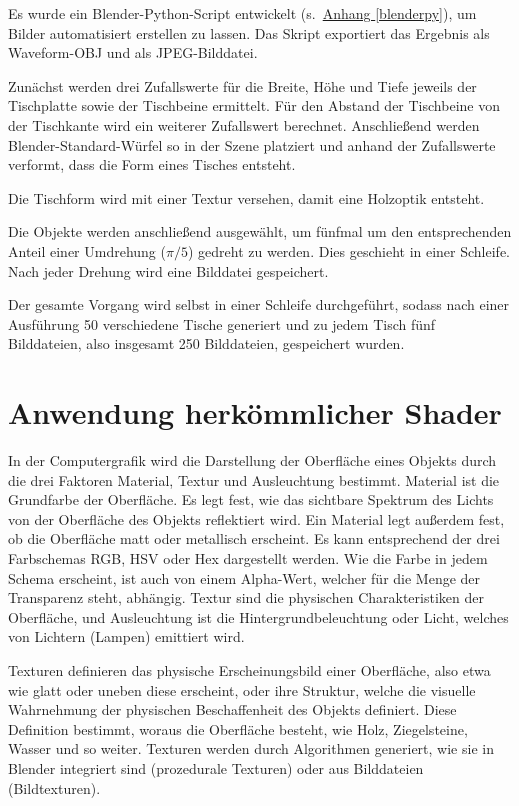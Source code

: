 Es wurde ein Blender-Python-Script entwickelt (s.~\hyperref[blenderpy]{Anhang \ref{blenderpy}}), um Bilder automatisiert erstellen zu lassen. Das Skript exportiert das Ergebnis als Waveform-OBJ und als JPEG-Bilddatei.

Zunächst werden drei Zufallswerte für die Breite, Höhe und Tiefe jeweils der Tischplatte sowie der Tischbeine ermittelt. Für den Abstand der Tischbeine von der Tischkante wird ein weiterer Zufallswert berechnet. Anschließend werden Blender-Standard-Würfel so in der Szene platziert und anhand der Zufallswerte verformt, dass die Form eines Tisches entsteht.

Die Tischform wird mit einer Textur versehen, damit eine Holzoptik entsteht.

Die Objekte werden anschließend ausgewählt, um fünfmal um den entsprechenden Anteil einer Umdrehung ($\pi/5$) gedreht zu werden. Dies geschieht in einer Schleife. Nach jeder Drehung wird eine Bilddatei gespeichert.

Der gesamte Vorgang wird selbst in einer Schleife durchgeführt, sodass nach einer Ausführung 50 verschiedene Tische generiert und zu jedem Tisch fünf Bilddateien, also insgesamt 250 Bilddateien, gespeichert wurden.


\section{Anwendung herkömmlicher Shader}
\label{sec:shader}
In der Computergrafik wird die Darstellung der Oberfläche eines Objekts durch die drei Faktoren Material, Textur und Ausleuchtung bestimmt. Material ist die Grundfarbe der Oberfläche. Es legt fest, wie das sichtbare Spektrum des Lichts von der Oberfläche des Objekts reflektiert wird. Ein Material legt außerdem fest, ob die Oberfläche matt oder metallisch erscheint. Es kann entsprechend der drei Farbschemas RGB, HSV oder Hex dargestellt werden. Wie die Farbe in jedem Schema erscheint, ist auch von einem Alpha-Wert, welcher für die Menge der Transparenz steht, abhängig. Textur sind die physischen Charakteristiken der Oberfläche, und Ausleuchtung ist die Hintergrundbeleuchtung oder Licht, welches von Lichtern (Lampen) emittiert wird. \cite{blain2020blender}

Texturen definieren das physische Erscheinungsbild einer Oberfläche, also etwa wie glatt oder uneben diese erscheint, oder ihre Struktur, welche die visuelle Wahrnehmung der physischen Beschaffenheit des Objekts definiert. Diese Definition bestimmt, woraus die Oberfläche besteht, wie Holz, Ziegelsteine, Wasser und so weiter. Texturen werden durch Algorithmen generiert, wie sie in Blender integriert sind (prozedurale Texturen) oder aus Bilddateien (Bildtexturen). \cite{blain2020blender}

